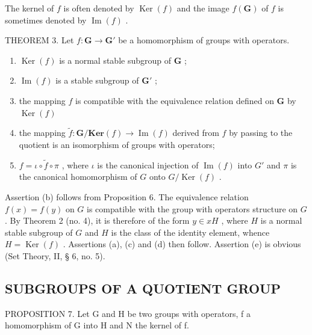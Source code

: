 The kernel of \(f\) is often denoted by \(\operatorname{Ker}(f)\) and the image \(f(\mathbf{G})\) of \(f\) is sometimes denoted by \(\operatorname{Im}(f)\) .

THEOREM 3. Let \(f: \mathbf{G} \to \mathbf{G}'\) be a homomorphism of groups with operators.

\begin{enumerate}
\def\labelenumi{(\alph{enumi})}
\item
  \(\operatorname{Ker}(f)\) is a normal stable subgroup of \(\mathbf{G}\) ;
\item
  \(\operatorname{Im}(f)\) is a stable subgroup of \(\mathbf{G}'\) ;
\item
  the mapping \(f\) is compatible with the equivalence relation defined on \(\mathbf{G}\) by \(\operatorname{Ker}(f)\)
\item
  the mapping \(\tilde{f}\colon \mathbf{G} / \mathbf{Ker}(f)\to \operatorname {Im}(f)\) derived from \(f\) by passing to the quotient is an isomorphism of groups with operators;
\item
  \(f = \iota \circ \tilde{f} \circ \pi\) , where \(\iota\) is the canonical injection of \(\operatorname{Im}(f)\) into \(G'\) and \(\pi\) is the canonical homomorphism of \(G\) onto \(G / \operatorname{Ker}(f)\) .
\end{enumerate}

Assertion (b) follows from Proposition 6. The equivalence relation \(f(x) = f(y)\) on \(G\) is compatible with the group with operators structure on \(G\) . By Theorem 2 (no. 4), it is therefore of the form \(y \in xH\) , where \(H\) is a normal stable subgroup of \(G\) and \(H\) is the class of the identity element, whence \(H = \operatorname{Ker}(f)\) . Assertions (a), (c) and (d) then follow. Assertion (e) is obvious (Set Theory, II, § 6, no. 5).

\subsection{SUBGROUPS OF A QUOTIENT GROUP}

PROPOSITION 7. Let G and H be two groups with operators, f a homomorphism of G into H and N the kernel of f.

